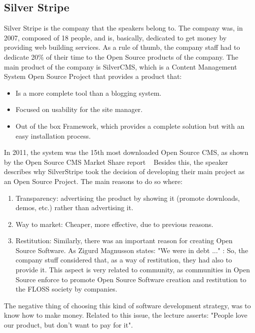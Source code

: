 \documentclass[11pt]{article}
\begin{document}
\subsection{Silver Stripe}
Silver Stripe is the company that the speakers belong to. The company was, in 2007, composed of 18 people, and is, basically, dedicated to get money by providing web building services.
As a rule of thumb, the company staff had to dedicate 20\% of their time to the Open Source products of the company.
The main product of the company is SilverCMS, which is a Content Management System Open Source Project that provides a product that:
\begin{itemize}\itemsep0pt
\item{Is a more complete tool than a blogging system}.
\item{Focused on usability for the site manager}.
\item{Out of the box Framework, which provides a complete solution but with an easy installation process}.
\end{itemize}
In 2011, the system was the 15th most downloaded Open Source CMS, as shown by the Open Source CMS Market Share report ~\cite{CMS00}
Besides this, the speaker describes why SilverStripe took the decision of developing their main project as an Open Source Project. The main reasons to do so where:
\begin{enumerate}\itemsep0pt
\item{Transparency}: advertising the product by showing it (promote downloads, demos, etc.) rather than advertising it.
\item{Way to market}: Cheaper, more effective, due to previous reasons.
\item{Restitution}: Similarly, there was an important reason for creating Open Source Software. As Zigurd Magnusson states:
"We were in debt ..." : So, the company stuff considered that, as a way of restitution, they had also to provide it.  This aspect is very related to community, as communities in Open Source enforce to promote Open Source Software creation and restitution to the FLOSS society by companies.
\end{enumerate}
The negative thing of choosing this kind of software development strategy, was to know how to make money. Related to this issue, the lecture asserts: "People love our product, but don't want to pay for it".
\end{document}
